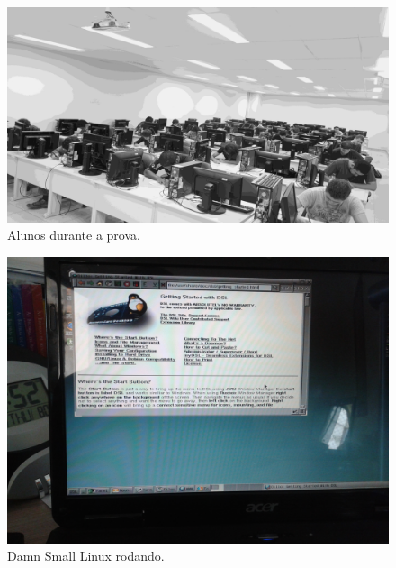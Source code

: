 \documentclass{ieee}
\begin{document}
  \begin{figure}[h]

	\centerline{\includegraphics[scale=0.12]{result.png}}	

	\caption{Alunos durante a prova.}

\end{figure}
  \begin{figure}[h]

	\centerline{\includegraphics[scale=0.075]{dsl.jpg}}	

	\caption{Damn Small Linux rodando.}

\end{figure}
\end{document}
